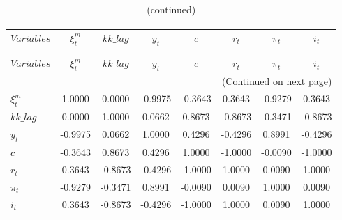  
\begin{center}
\begin{longtable}{lccccccc} 
\caption{MATRIX OF CORRELATIONS}\\
 \label{Table:th_corr_matrix}\\
\toprule 
$Variables  $	 & 	 $   \xi^m_t$	 & 	 $   kk\_lag$	 & 	 $        y_t$	 & 	 $          c$	 & 	 $        r_t$	 & 	 $     \pi_t$	 & 	 $        i_t$\\
\midrule \endfirsthead 
\caption{(continued)}\\
 \toprule \\ 
$Variables  $	 & 	 $   \xi^m_t$	 & 	 $   kk\_lag$	 & 	 $        y_t$	 & 	 $          c$	 & 	 $        r_t$	 & 	 $     \pi_t$	 & 	 $        i_t$\\
\midrule \endhead 
\midrule \multicolumn{8}{r}{(Continued on next page)} \\ \bottomrule \endfoot 
\bottomrule \endlastfoot 
$\xi^m_t    $	 & 	     1.0000	 & 	     0.0000	 & 	    -0.9975	 & 	    -0.3643	 & 	     0.3643	 & 	    -0.9279	 & 	     0.3643 \\ 
$kk\_lag    $	 & 	     0.0000	 & 	     1.0000	 & 	     0.0662	 & 	     0.8673	 & 	    -0.8673	 & 	    -0.3471	 & 	    -0.8673 \\ 
$y_t        $	 & 	    -0.9975	 & 	     0.0662	 & 	     1.0000	 & 	     0.4296	 & 	    -0.4296	 & 	     0.8991	 & 	    -0.4296 \\ 
$c          $	 & 	    -0.3643	 & 	     0.8673	 & 	     0.4296	 & 	     1.0000	 & 	    -1.0000	 & 	    -0.0090	 & 	    -1.0000 \\ 
$r_t        $	 & 	     0.3643	 & 	    -0.8673	 & 	    -0.4296	 & 	    -1.0000	 & 	     1.0000	 & 	     0.0090	 & 	     1.0000 \\ 
$\pi_t      $	 & 	    -0.9279	 & 	    -0.3471	 & 	     0.8991	 & 	    -0.0090	 & 	     0.0090	 & 	     1.0000	 & 	     0.0090 \\ 
$i_t        $	 & 	     0.3643	 & 	    -0.8673	 & 	    -0.4296	 & 	    -1.0000	 & 	     1.0000	 & 	     0.0090	 & 	     1.0000 \\ 
\end{longtable}
 \end{center}

